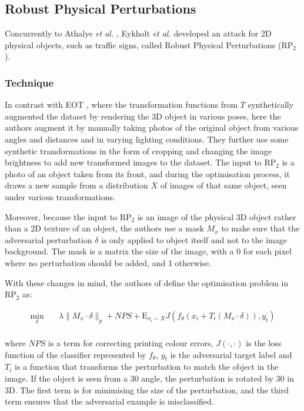 \subsection{Robust Physical Perturbations}

Concurrently to Athalye \textit{et al.} \cite{athalye}, Eykholt \textit{et al.} \cite{evtimov_road_signs} developed an attack for 2D physical objects, such as traffic signs, called Robust Physical Perturbations ($\textrm{RP}_2$).

\subsubsection{Technique}

In contrast with EOT \cite{athalye}, where the transformation functions from $T$ synthetically augmented the dataset by rendering the 3D object in various poses, here the authors augment it by manually taking photos of the original object from various angles and distances and in varying lighting conditions. They further use some synthetic transformations in the form of cropping and changing the image brightness to add new transformed images to the dataset. The input to $\textrm{RP}_2$ is a photo of an object taken from its front, and during the optimisation process, it draws a new sample from a distribution $X$ of images of that same object, seen under various transformations.

Moreover, because the input to $\textrm{RP}_2$ is an image of the physical 3D object rather than a 2D texture of an object, the authors use a mask $M_x$ to make sure that the adversarial perturbation $\delta$ is only applied to object itself and not to the image background. The mask is a matrix the size of the image, with a 0 for each pixel where no perturbation should be added, and 1 otherwise. 

With these changes in mind, the authors of \cite{evtimov_road_signs} define the optimisation problem in $\textrm{RP}_2$ as:

\begin{equation}
\begin{aligned}
\min_{\delta} \quad & \lambda\|M_x \cdot \delta\|_p + NPS + \mathrm{E}_{x_i\sim X}J(f_\theta(x_i + T_i(M_x \cdot \delta)), y_t)\\
\label{eq:rp2}
\end{aligned}
\end{equation}

\noindent where $NPS$ is a term for correcting printing colour errors, $J(\cdot, \cdot)$ is the loss function of the classifier represented by $f_\theta$, $y_t$ is the adversarial target label and $T_i$ is a function that transforms the perturbation to match the object in the image. If the object is seen from a 30\degree{} angle, the perturbation is rotated by 30\degree{} in 3D. The first term is for minimising the size of the perturbation, and the third term ensures that the adversarial example is misclassified.

